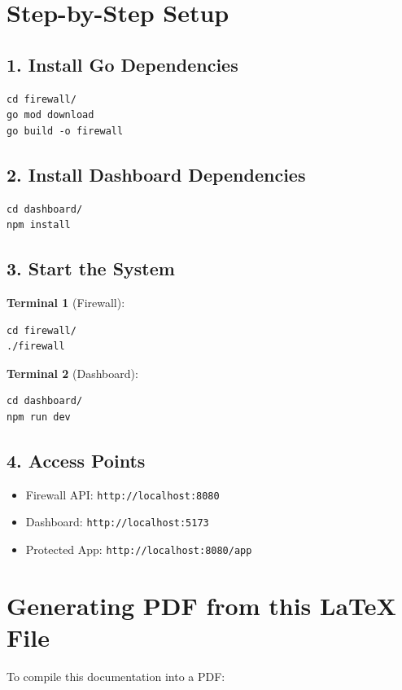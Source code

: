 \documentclass[11pt,a4paper]{report}
\begin{document}
\section{Step-by-Step Setup}

\subsection{1. Install Go Dependencies}
\begin{verbatim}
cd firewall/
go mod download
go build -o firewall
\end{verbatim}

\subsection{2. Install Dashboard Dependencies}
\begin{verbatim}
cd dashboard/
npm install
\end{verbatim}

\subsection{3. Start the System}
\textbf{Terminal 1} (Firewall):
\begin{verbatim}
cd firewall/
./firewall
\end{verbatim}

\textbf{Terminal 2} (Dashboard):
\begin{verbatim}
cd dashboard/
npm run dev
\end{verbatim}

\subsection{4. Access Points}
\begin{itemize}
    \item Firewall API: \texttt{http://localhost:8080}
    \item Dashboard: \texttt{http://localhost:5173}
    \item Protected App: \texttt{http://localhost:8080/app}
\end{itemize}

\section{Generating PDF from this LaTeX File}

To compile this documentation into a PDF:
\end{document}
